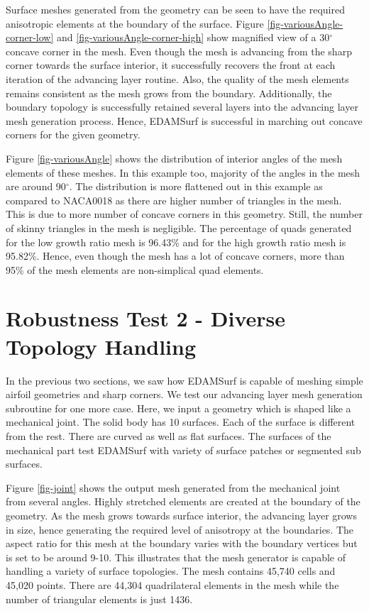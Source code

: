 Surface meshes generated from the geometry can be seen to have the required anisotropic elements at the boundary of the surface. Figure \ref{fig-variousAngle-corner-low} and \ref{fig-variousAngle-corner-high} show magnified view of a 30$^\circ$ concave corner in the mesh. Even though the mesh is advancing from the sharp corner towards the surface interior, it successfully recovers the front at each iteration of the advancing layer routine. Also, the quality of the mesh elements remains consistent as the mesh grows from the boundary. Additionally, the boundary topology is successfully retained several layers into the advancing layer mesh generation process. Hence, EDAMSurf is successful in marching out concave corners for the given geometry.

Figure \ref{fig-variousAngle} shows the distribution of interior angles of the mesh elements of these meshes. In this example too, majority of the angles in the mesh are around 90$^\circ$. The distribution is more flattened out in this example as compared to NACA0018 as there are higher number of triangles in the mesh. This is due to more number of concave corners in this geometry. Still, the number of skinny triangles in the mesh is negligible. The percentage of quads generated for the low growth ratio mesh is 96.43\% and for the high growth ratio mesh is 95.82\%. Hence, even though the mesh has a lot of concave corners, more than 95\% of the mesh elements are non-simplical quad elements.

\section{Robustness Test 2 - Diverse Topology Handling}

In the previous two sections, we saw how EDAMSurf is capable of meshing simple airfoil geometries and sharp corners. We test our advancing layer mesh generation subroutine for one more case. Here, we input a geometry which is shaped like a mechanical joint. The solid body has 10 surfaces. Each of the surface is different from the rest. There are curved as well as flat surfaces. The surfaces of the mechanical part test EDAMSurf with variety of surface patches or segmented sub surfaces.

Figure \ref{fig-joint} shows the output mesh generated from the mechanical joint from several angles. Highly stretched elements are created at the boundary of the geometry. As the mesh grows towards surface interior, the advancing layer grows in size, hence generating the required level of anisotropy at the boundaries. The aspect ratio for this mesh at the boundary varies with the boundary vertices but is set to be around 9-10. This illustrates that the mesh generator is capable of handling a variety of surface topologies. The mesh contains 45,740 cells and 45,020 points. There are 44,304 quadrilateral elements in the mesh while the number of triangular elements is just 1436.


